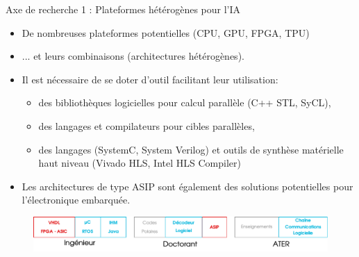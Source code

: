 \documentclass[t,compress,mathserif,12pt,xcolor=dvipsnames]{beamer}
\begin{document}
\begin{frame}[t]{Axe de recherche 1 : Plateformes hétérogènes pour l'IA}
  \begin{minipage}[t][5.0cm][t]{\textwidth}
    \vspace{-0.5cm}
    \begin{itemize}
      \item<+-> De nombreuses plateformes potentielles (CPU, GPU, FPGA, TPU)
      \item<+-> ... et leurs combinaisons (architectures hétérogènes).
      \item<+-> Il est nécessaire de se doter d'outil facilitant leur utilisation:
      \begin{itemize}
        \item<+-> des bibliothèques logicielles pour calcul parallèle (C++ STL, SyCL),
        \item<+-> des langages et compilateurs pour cibles parallèles,
        \item<+-> des langages (SystemC, System Verilog) et outils de synthèse matérielle haut niveau (Vivado HLS,
        Intel HLS Compiler)
      \end{itemize}
      \item<+-> Les architectures de type ASIP sont également des solutions potentielles pour l'électronique embarquée.
    \end{itemize}
  \end{minipage}
  \begin{figure}[htp]
    \centering
    \includegraphics[width=\textwidth]{fig/frise12}
  \end{figure}
\end{frame}
\end{document}
